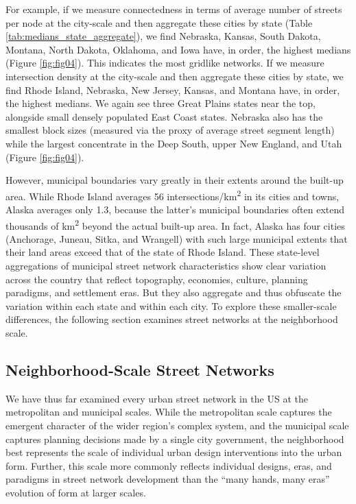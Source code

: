 \documentclass[11pt]{article}
\begin{document}
\begin{multicols}{2}
For example, if we measure connectedness in terms of average number of streets per node at the city-scale and then aggregate these cities by state (Table \ref{tab:medians_state_aggregate}), we find Nebraska, Kansas, South Dakota, Montana, North Dakota, Oklahoma, and Iowa have, in order, the highest medians (Figure \ref{fig:fig04}). This indicates the most gridlike networks. If we measure intersection density at the city-scale and then aggregate these cities by state, we find Rhode Island, Nebraska, New Jersey, Kansas, and Montana have, in order, the highest medians. We again see three Great Plains states near the top, alongside small densely populated East Coast states. Nebraska also has the smallest block sizes (measured via the proxy of average street segment length) while the largest concentrate in the Deep South, upper New England, and Utah (Figure \ref{fig:fig04}).

However, municipal boundaries vary greatly in their extents around the built-up area. While Rhode Island averages 56 intersections/km\textsuperscript{2} in its cities and towns, Alaska averages only 1.3, because the latter's municipal boundaries often extend thousands of km\textsuperscript{2} beyond the actual built-up area. In fact, Alaska has four cities (Anchorage, Juneau, Sitka, and Wrangell) with such large municipal extents that their land areas exceed that of the state of Rhode Island. These state-level aggregations of municipal street network characteristics show clear variation across the country that reflect topography, economies, culture, planning paradigms, and settlement eras. But they also aggregate and thus obfuscate the variation within each state and within each city. To explore these smaller-scale differences, the following section examines street networks at the neighborhood scale.



\subsection{Neighborhood-Scale Street Networks}

We have thus far examined every urban street network in the US at the metropolitan and municipal scales. While the metropolitan scale captures the emergent character of the wider region's complex system, and the municipal scale captures planning decisions made by a single city government, the neighborhood best represents the scale of individual urban design interventions into the urban form. Further, this scale more commonly reflects individual designs, eras, and paradigms in street network development than the \enquote{many hands, many eras} evolution of form at larger scales.


\end{multicols}
\end{document}
